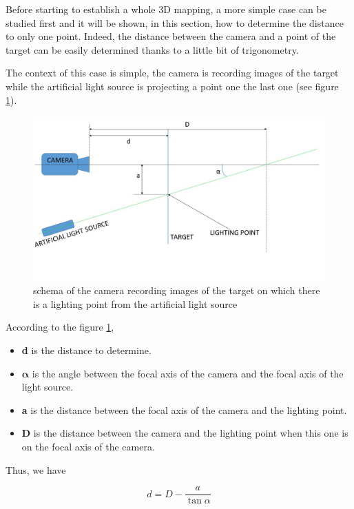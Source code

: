 Before starting to establish a whole 3D mapping, a more simple case can be studied first and it will be shown, in this section, how to determine the distance to only one point. Indeed, the distance between the camera and a point of the target can be easily determined thanks to a little bit of trigonometry.

The context of this case is simple, the camera is recording images of the target while the artificial light source is projecting a point one the last one (see figure \ref{fig:schema1D}).

\begin{figure}[h]
  \centerline{\includegraphics[scale=0.5]{fig/schema1D.jpg}}
  \caption{schema of the camera recording images of the target on which there is a lighting point from the artificial light source}
  \label{fig:schema1D}
\end{figure}

According to the figure \ref{fig:schema1D}, 
\begin{itemize}
\item \textbf{d} is the distance to determine.
\item $\bm{\alpha}$ is the angle between the focal axis of the camera and the focal axis of the light source.
\item \textbf{a} is the distance between the focal axis of the camera and the lighting point.
\item \textbf{D} is the distance between the camera and the lighting point when this one is on the focal axis of the camera.
\end{itemize}
Thus, we have

\begin{equation*}
	d=D-\frac{a}{\tan \alpha}
\label{eq:formule_1D}
\end{equation*}

